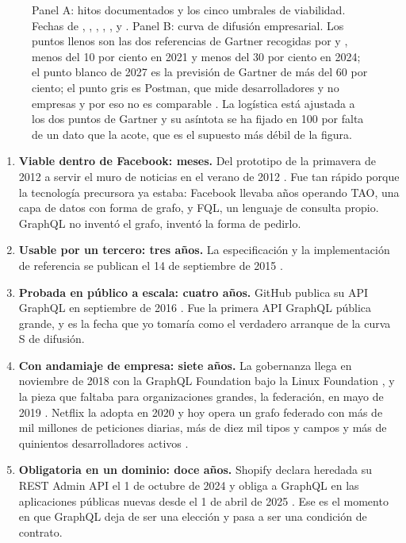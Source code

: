 \documentclass[11pt,letterpaper]{article}
\newcommand{\dx}[1]{((#1)-2014)*0.775}
\newcommand{\dy}[1]{(#1)*0.038}
\begin{document}
\begin{figure}[!htb]
\caption{Panel A: hitos documentados y los cinco umbrales de viabilidad. Fechas
de \textcite{postman2024historia}, \textcite{graphql2015},
\textcite{github2016}, \textcite{techcrunch2018},
\textcite{apollo2024federacion}, \textcite{spec2025} y
\textcite{shopify2024rest}. Panel B: curva de difusión empresarial. Los puntos
llenos son las dos referencias de Gartner recogidas por \textcite{ibm2023gartner}
y \textcite{wundergraph2026}, menos del 10 por ciento en 2021 y menos del 30
por ciento en 2024; el punto blanco de 2027 es la previsión de Gartner de más
del 60 por ciento; el punto gris es Postman, que mide desarrolladores y no
empresas y por eso no es comparable \parencite{postman2025}. La logística está
ajustada a los dos puntos de Gartner y su asíntota se ha fijado en 100 por
falta de un dato que la acote, que es el supuesto más débil de la figura.}
\label{fig:cronologia}
\end{figure}

\begin{enumerate}
\item \textbf{Viable dentro de Facebook: meses.} Del prototipo de la primavera
  de 2012 a servir el muro de noticias en el verano de 2012
  \parencite{postman2024historia}. Fue tan rápido porque la tecnología
  precursora ya estaba: Facebook llevaba años operando TAO, una capa de datos
  con forma de grafo, y FQL, un lenguaje de consulta propio. GraphQL no inventó
  el grafo, inventó la forma de pedirlo.
\item \textbf{Usable por un tercero: tres años.} La especificación y la
  implementación de referencia se publican el 14 de septiembre de 2015
  \parencite{graphql2015}.
\item \textbf{Probada en público a escala: cuatro años.} GitHub publica su API
  GraphQL en septiembre de 2016 \parencite{github2016}. Fue la primera API
  GraphQL pública grande, y es la fecha que yo tomaría como el verdadero
  arranque de la curva S de difusión.
\item \textbf{Con andamiaje de empresa: siete años.} La gobernanza llega en
  noviembre de 2018 con la GraphQL Foundation bajo la Linux Foundation
  \parencite{techcrunch2018}, y la pieza que faltaba para organizaciones
  grandes, la federación, en mayo de 2019 \parencite{apollo2024federacion}.
  Netflix la adopta en 2020 y hoy opera un grafo federado con más de mil
  millones de peticiones diarias, más de diez mil tipos y campos y más de
  quinientos desarrolladores activos \parencite{netflix2020,infoq2022netflix}.
\item \textbf{Obligatoria en un dominio: doce años.} Shopify declara heredada
  su REST Admin API el 1 de octubre de 2024 y obliga a GraphQL en las
  aplicaciones públicas nuevas desde el 1 de abril de 2025
  \parencite{shopify2024rest,shopify2025graphql}. Ese es el momento en que
  GraphQL deja de ser una elección y pasa a ser una condición de contrato.
\end{enumerate}
\end{document}
